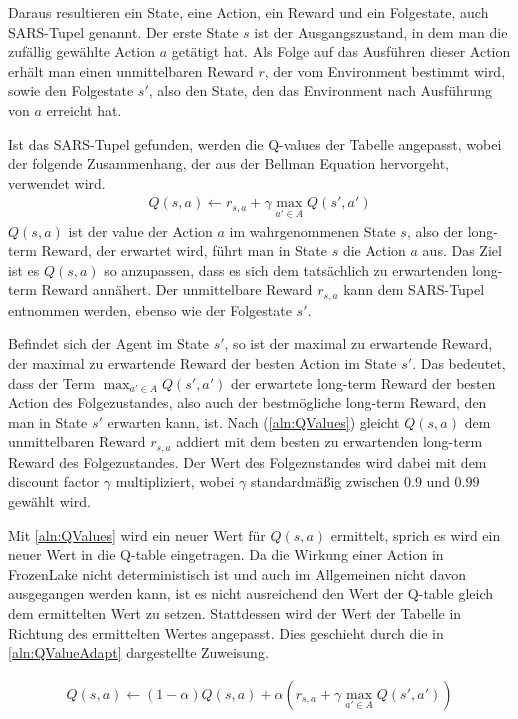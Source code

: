 \documentclass[11pt]{scrartcl}
\begin{document}
Daraus resultieren ein State, eine Action, ein Reward und ein Folgestate, auch SARS-Tupel
genannt. Der erste State $s$ ist der Ausgangszustand, in dem man die zufällig gewählte
Action $a$ getätigt hat. Als Folge auf das Ausführen dieser Action erhält man einen
unmittelbaren Reward $r$, der vom Environment bestimmt wird, sowie den Folgestate $s'$,
also den State, den das Environment nach Ausführung von $a$ erreicht hat.

Ist das SARS-Tupel gefunden, werden die Q-values der Tabelle angepasst, wobei der folgende
Zusammenhang, der aus der Bellman Equation hervorgeht, verwendet wird.
\begin{align}
Q(s, a) \leftarrow r_{s,a} + \gamma \max_{a' \in A}Q(s', a')
\label{aln:QValues}
\end{align}
\noindent
$Q(s, a)$ ist der value der Action $a$ im wahrgenommenen State $s$, also der long-term
Reward, der erwartet wird, führt man in State $s$ die Action $a$ aus. Das Ziel ist es
$Q(s, a)$ so anzupassen, dass es sich dem tatsächlich zu erwartenden long-term Reward
annähert. Der unmittelbare Reward $r_{s,a}$ kann dem SARS-Tupel entnommen werden, ebenso
wie der Folgestate $s'$.

Befindet sich der Agent im State $s'$, so ist der maximal zu erwartende Reward, der 
maximal zu erwartende Reward der besten Action im State $s'$. Das bedeutet, dass %
der Term $\max_{a'\in A} Q(s', a')$ der erwartete long-term Reward der besten Action des
Folgezustandes, also auch der bestmögliche long-term Reward, den man in State $s'$
erwarten kann, ist. Nach (\ref{aln:QValues}) gleicht $Q(s, a)$ dem unmittelbaren Reward
$r_{s,a}$ addiert mit dem besten zu erwartenden long-term Reward des Folgezustandes. Der
Wert des Folgezustandes wird dabei mit dem discount factor $\gamma$ multipliziert, wobei 
$\gamma$ standardmäßig zwischen $0.9$ und $0.99$ gewählt wird.

Mit \autoref{aln:QValues} wird ein neuer Wert für $Q(s, a)$ ermittelt, sprich es wird ein
neuer Wert in die Q-table eingetragen. Da die Wirkung einer Action in FrozenLake nicht
deterministisch ist und auch im Allgemeinen nicht davon ausgegangen werden kann, ist es
nicht ausreichend den Wert der Q-table gleich dem ermittelten Wert zu setzen. Stattdessen
wird der Wert der Tabelle in Richtung des ermittelten Wertes angepasst. Dies geschieht durch 
die in \autoref{aln:QValueAdapt} dargestellte Zuweisung.

\begin{align}
  Q(s, a) \leftarrow (1 - \alpha)Q(s, a) +
  \alpha(r_{s, a} + \gamma \max_{a'\in A}Q(s', a'))
\label{aln:QValueAdapt}
\end{align}
\noindent
\end{document}
